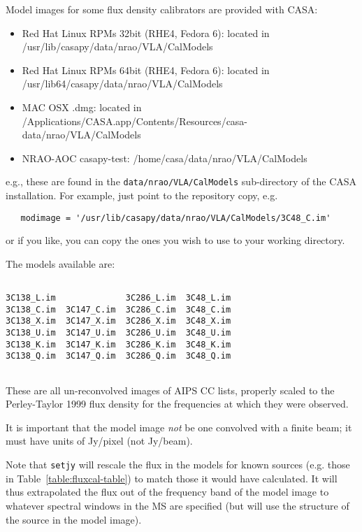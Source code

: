 Model images for some flux density calibrators are provided with CASA:
\begin{itemize}
   \item Red Hat Linux RPMs 32bit (RHE4, Fedora 6): 
         located in /usr/lib/casapy/data/nrao/VLA/CalModels
   \item Red Hat Linux RPMs 64bit (RHE4, Fedora 6): 
         located in /usr/lib64/casapy/data/nrao/VLA/CalModels
   \item MAC OSX .dmg: located in /Applications/CASA.app/Contents/Resources/casa-data/nrao/VLA/CalModels
   \item NRAO-AOC casapy-test: /home/casa/data/nrao/VLA/CalModels
\end{itemize}
e.g., these are found in the {\tt data/nrao/VLA/CalModels}
sub-directory of the CASA installation.  For example, just point to the
repository copy, e.g.
\small
\begin{verbatim}
   modimage = '/usr/lib/casapy/data/nrao/VLA/CalModels/3C48_C.im'
\end{verbatim}
\normalsize
or if you like, you can copy the ones you wish to use to your working
directory.

The models available are:
\small
\begin{verbatim}

3C138_L.im              3C286_L.im  3C48_L.im
3C138_C.im  3C147_C.im  3C286_C.im  3C48_C.im
3C138_X.im  3C147_X.im  3C286_X.im  3C48_X.im
3C138_U.im  3C147_U.im  3C286_U.im  3C48_U.im
3C138_K.im  3C147_K.im  3C286_K.im  3C48_K.im
3C138_Q.im  3C147_Q.im  3C286_Q.im  3C48_Q.im


\end{verbatim}
\normalsize
These are all un-reconvolved images of AIPS CC lists, properly scaled
to the Perley-Taylor 1999 flux density for the frequencies at which 
they were observed.

It is important that the model image {\em not} be one
convolved with a finite beam; it must have units of Jy/pixel (not
Jy/beam).  

Note that {\tt setjy} will rescale the flux in the models for known
sources (e.g. those in Table~\ref{table:fluxcal-table}) to match those
it would have calculated.  It will thus extrapolated the flux out of
the frequency band of the model image to whatever spectral windows
in the MS are specified (but will use the structure of the source
in the model image).

